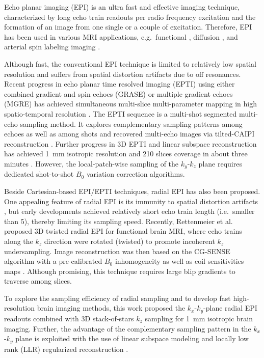\documentclass[a4paper,11pt]{article}
\begin{document}
Echo planar imaging (EPI) \cite{mansfield_1977_epi} is 
an ultra fast and effective imaging technique, 
characterized by long echo train readouts per radio frequency excitation and 
the formation of an image from one single or a couple of excitation.
Therefore, EPI has been used in various MRI applications, 
e.g.~functional \cite{ogawa_1990_fmri}, diffusion \cite{lebihan_1986_diff}, 
and arterial spin labeling imaging \cite{feinberg_2013_asl}. 

Although fast, the conventional EPI technique is limited to relatively 
low spatial resolution and suffers from spatial distortion artifacts 
due to off resonances. 
Recent progress in echo planar time resolved imaging (EPTI) 
using either combined gradient and spin echoes (GRASE) 
or multiple gradient echoes (MGRE) has achieved simultaneous 
multi-slice multi-parameter mapping in high spatio-temporal resolution 
\cite{wang_2019_epti}. 
The EPTI sequence is a multi-shot segmented multi-echo sampling method. 
It explores complementary sampling patterns 
among echoes as well as among shots and recovered multi-echo images 
via tilted-CAIPI reconstruction \cite{dong_2019_tilted_capi}. 
Further progress in 3D EPTI and linear subspace reconstruction 
has achieved \SI{1}{\mm} isotropic resolution and 210 slices coverage 
in about three minutes \cite{dong_2021_vfa_epti}. 
However, the local-patch-wise sampling of the $k_y$-$k_z$ plane 
requires dedicated shot-to-shot $B_0$ variation correction algorithms.

Beside Cartesian-based EPI/EPTI techniques, 
radial EPI has also been proposed. 
One appealing feature of radial EPI is its immunity to 
spatial distortion artifacts \cite{silva_1998_repi}, 
but early developments 
\cite{seifert_2000_rtse,theilmann_2004_vo_rfse,jung_2009_rssfp,lee_2010_repi,bhat_2011_repi_heart} 
achieved relatively short echo train length (i.e.~smaller than 5), 
thereby limiting its sampling speed.
Recently, Rettenmeier et al.~\cite{rettenmeier_2021_repi} proposed 3D 
twisted radial EPI for functional brain MRI, 
where echo trains along the $k_z$ direction were rotated (twisted) 
to promote incoherent $k_z$ undersampling. 
Image reconstruction was then based on 
the CG-SENSE algorithm \cite{pruessmann_2001_gsense} with a pre-calibrated 
$B_0$ inhomogeneity \cite{funai_2008_secondorder} as well as 
coil sensitivities maps \cite{walsh_2000_coil}. 
Although promising, this technique requires 
large blip gradients to traverse among slices.

To explore the sampling efficiency of radial sampling 
and to develop fast high-resolution brain imaging methods, 
this work proposed the $k_x$-$k_y$-plane radial EPI readouts 
\cite{tan_2016_phd,tan_2019_mobawf} 
combined with 3D stack-of-stars $k_z$ sampling \cite{block_2014_rad} 
for \SI{1}{\mm} isotropic brain imaging. 
Further, the advantage of the complementary sampling pattern 
in the $k_x$-$k_y$ plane is exploited 
with the use of 
linear subspace modeling \cite{huang_2012_t2basis,tamir_2017_t2shuffling} 
and locally low rank (LLR) regularized reconstruction \cite{zhang_2015_llr}.
\end{document}
